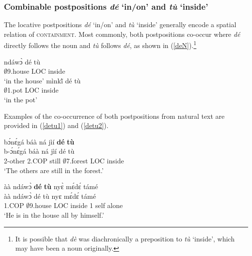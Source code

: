 \subsubsection[Combinable postpositions {\itshape dé} and {\itshape tù}]{Combinable postpositions {\itshape dé} `in/on' and {\itshape tù} `inside'}
\label{sec:LOCde}

The locative postpositions {\itshape dé} `in/on' and {\itshape tù} `inside' generally encode a spatial relation of \textsc{containment}. Most commonly, both postpositions co-occur where {\itshape dé} directly follows the noun and {\itshape tù} follows {\itshape dé}, as shown in (\ref{deN}).\footnote{It is possible that {\itshape dè} was diachronically a preposition to {\itshape tù} `inside', which may have been a noun originally.}

\begin{exe}
\ex\label{deN}
\begin{xlist}
\ex \gll ndáwɔ̀ dé tù  \\
      $\emptyset$9.house LOC inside \\
\trans`in the house'
\ex  \gll mìnkĩ́ dé tù  \\
 $\emptyset$1.pot LOC inside \\
\trans `in the pot'
\end{xlist}
\end{exe}

Examples of the co-occurrence of both postpositions from natural text are provided in (\ref{detu1}) and (\ref{detu2}).

\begin{exe} 
\ex\label{detu1}
  \glll  bɔ́nɛ́gá báà ná jìí {\bfseries dé} {\bfseries tù} \\
        b-ɔ́nɛ́gá báà ná jìí dé tù \\
          2-other 2.COP still $\emptyset$7.forest LOC inside  \\
    \trans `The others are still in the forest.'
\end{exe}

\begin{exe} 
\ex\label{detu2}
  \glll   àà ndáwɔ̀ {\bfseries dé} {\bfseries tù} nyɛ̀ mɛ́dɛ́ támé   \\
           àà ndáwɔ̀ dé tù nyɛ mɛ́dɛ́ támé      \\
          1.COP $\emptyset$9.house LOC inside 1 self alone \\
    \trans `He is in the house all by himself.'
\end{exe}

